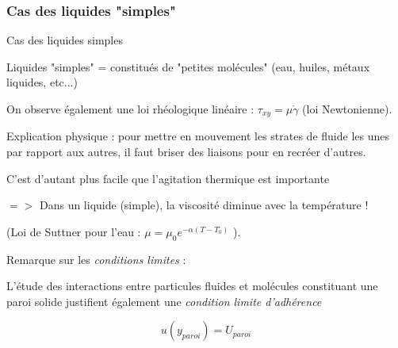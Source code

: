 \subsubsection{Cas des liquides "simples"}
\begin{frame}{Cas des liquides simples}

\small
\bigskip

Liquides "simples" = constitués de "petites molécules" (eau, huiles, métaux liquides, etc...)

\bigskip

On observe également une loi rhéologique linéaire : $\tau_{xy} = \mu \dot{\gamma}$ (loi Newtonienne).

\smallskip
Explication physique : pour mettre en mouvement les strates de fluide les unes par rapport aux autres, il faut briser des liaisons pour en recréer d'autres.

\bigskip


C'est d'autant plus facile que l'agitation thermique est importante

\smallskip
$=>$ Dans un liquide (simple),  la viscosité diminue avec la température !

\smallskip
(Loi de Suttner pour l'eau : $\mu = \mu_0 e^{-\alpha (T-T_0)}$ ).



\pause
\bigskip
Remarque sur les {\em conditions limites } :

L'étude des interactions entre particules fluides et molécules constituant une paroi solide justifient également
une {\em condition limite d'adhérence }

\smallskip 
$$
u(y_{paroi}) = U_{paroi}
$$




\end{frame}

